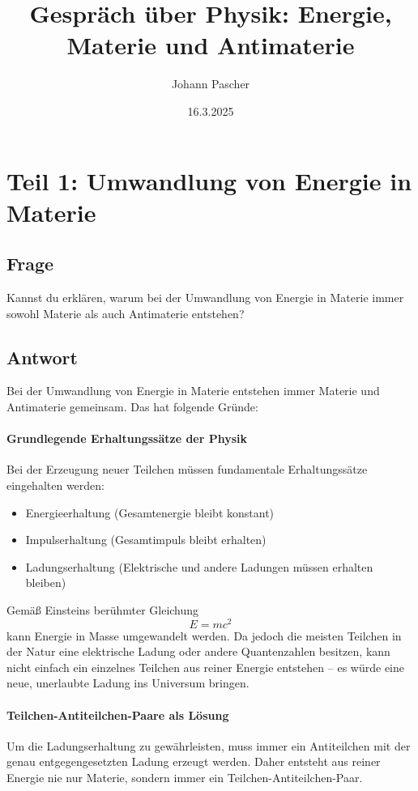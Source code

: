 \documentclass{article}
\title{Gespräch über Physik: Energie, Materie und Antimaterie}
\author{Johann Pascher}
\date{16.3.2025}
\begin{document}
	
	\maketitle
	
	\section{Teil 1: Umwandlung von Energie in Materie}
	
	\subsection{Frage}
	Kannst du erklären, warum bei der Umwandlung von Energie in Materie immer sowohl Materie als auch Antimaterie entstehen?
	
	\subsection{Antwort}
	Bei der Umwandlung von Energie in Materie entstehen immer Materie und Antimaterie gemeinsam. Das hat folgende Gründe:
	
	\paragraph{Grundlegende Erhaltungssätze der Physik}
	Bei der Erzeugung neuer Teilchen müssen fundamentale Erhaltungssätze eingehalten werden:
	\begin{itemize}
		\item Energieerhaltung (Gesamtenergie bleibt konstant)
		\item Impulserhaltung (Gesamtimpuls bleibt erhalten)
		\item Ladungserhaltung (Elektrische und andere Ladungen müssen erhalten bleiben)
	\end{itemize}
	
	Gemäß Einsteins berühmter Gleichung
	\begin{equation}
		E = mc^2
	\end{equation}
	kann Energie in Masse umgewandelt werden. Da jedoch die meisten Teilchen in der Natur eine elektrische Ladung oder andere Quantenzahlen besitzen, kann nicht einfach ein einzelnes Teilchen aus reiner Energie entstehen – es würde eine neue, unerlaubte Ladung ins Universum bringen.
	
	\paragraph{Teilchen-Antiteilchen-Paare als Lösung}
	Um die Ladungserhaltung zu gewährleisten, muss immer ein Antiteilchen mit der genau entgegengesetzten Ladung erzeugt werden. Daher entsteht aus reiner Energie nie nur Materie, sondern immer ein Teilchen-Antiteilchen-Paar.
	
\end{document}
